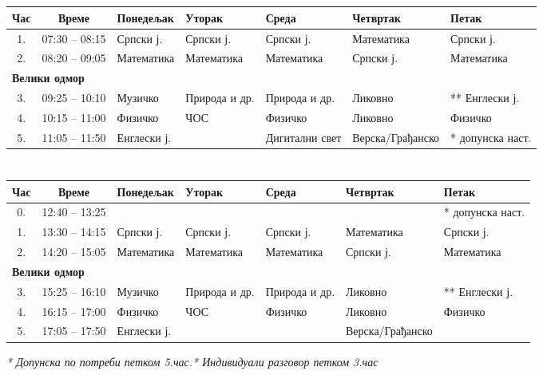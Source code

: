 \documentclass[14pt]{extarticle}
\begin{document}
\section*{%
}

\bigskip
\noindent
\begin{tabularx}{\textwidth}{|c|c|X|X|X|X|X|}
\hline
\textbf{Час} & \textbf{Време} & \textbf{Понедељак} & \textbf{Уторак} & \textbf{Среда} & \textbf{Четвртак} & \textbf{Петак} \\
\hline
1. & 07:30 -- 08:15 & Српски ј. & Српски ј. & Српски ј. & Математика & Српски ј. \\
\hline
2. & 08:20 -- 09:05 & Математика & Математика & Математика & Српски ј. & Математика \\
\hline
\multicolumn{7}{|l|}{\hspace*{1.1cm}\textbf{Велики одмор}} \\
\hline
3. & 09:25 -- 10:10 & Музичко & Природа и др. & Природа и др. & Ликовно & ** Енглески ј. \\
\hline
4. & 10:15 -- 11:00 & Физичко & ЧОС & Физичко & Ликовно & Физичко \\
\hline
5. & 11:05 -- 11:50 & Енглески ј. &  & Дигитални свет & Верска/Грађанско & * допунска наст.  \\
\hline
\end{tabularx}

\bigskip

\section*{%
}


\bigskip
\noindent
\begin{tabularx}{\textwidth}{|c|c|X|X|X|X|X|}
\hline
\textbf{Час} & \textbf{Време} & \textbf{Понедељак} & \textbf{Уторак} & \textbf{Среда} & \textbf{Четвртак} & \textbf{Петак} \\
\hline
0. & 12:40 -- 13:25 &  &  &  &  & * допунска наст. \\
\hline
1. & 13:30 -- 14:15 & Српски ј. & Српски ј. & Српски ј. & Математика & Српски ј. \\
\hline
2. & 14:20 -- 15:05 & Математика & Математика & Математика & Српски ј. & Математика \\
\hline
\multicolumn{7}{|l|}{\hspace*{1.1cm}\textbf{Велики одмор}} \\
\hline
3. & 15:25 -- 16:10 & Музичко & Природа и др. & Природа и др. & Ликовно & ** Енглески ј. \\
\hline
4. & 16:15 -- 17:00 & Физичко & ЧОС & Физичко & Ликовно & Физичко \\
\hline
5. & 17:05 -- 17:50 & Енглески ј. &  &  & Верска/Грађанско &  \\

\hline
\end{tabularx}

\bigskip
\bigskip
\noindent \textit{* Допунска по потреби петком 5.час.\hfill** Индивидуали разговор петком 3.час}
\end{document}

